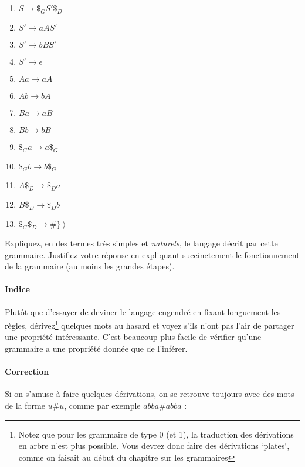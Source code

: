 \documentclass{article}[11pt]
\theoremstyle{definition}
\begin{document}
\begin{enumerate}

\item $S \rightarrow \$_GS'\$_D$
\item $S' \rightarrow aAS'$
\item $S' \rightarrow bBS'$
\item $S' \rightarrow \epsilon$
\item $Aa \rightarrow aA$
\item $Ab \rightarrow bA$
\item $Ba \rightarrow aB$
\item $Bb \rightarrow bB$
\item $\$_Ga \rightarrow a\$_G$
\item $\$_Gb \rightarrow b\$_G$
\item $A\$_D \rightarrow \$_Da$
\item $B\$_D \rightarrow \$_Db$
\item $\$_G\$_D \rightarrow \#\}\ \big \rangle$

\end{enumerate}

\noindent
Expliquez, en des termes très simples et \textit{naturels}, le langage décrit par cette grammaire. Justifiez votre réponse en expliquant succinctement le fonctionnement de la grammaire (au moins les grandes étapes).

\paragraph*{Indice} Plutôt que d'essayer de deviner le langage engendré en fixant longuement les règles, dérivez\footnote{Notez que pour les grammaire de type 0 (et 1), la traduction des dérivations en arbre n'est plus possible. Vous devrez donc faire des dérivations `plates`, comme on faisait au début du chapitre sur les grammaires} quelques mots au hasard et voyez s'ils n'ont pas l'air de partager une propriété intéressante. C'est beaucoup plus facile de vérifier qu'une grammaire a une propriété donnée que de l'inférer. 

\paragraph*{Correction} Si on s'amuse à faire quelques dérivations, on se retrouve toujours avec des mots de la forme $u\#u$, comme par exemple $abba\#abba$ : \newline
\end{document}
